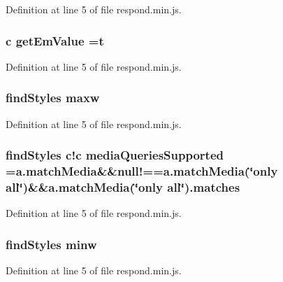 Definition at line 5 of file respond.\+min.\+js.

\subsubsection[{get\+Em\+Value}]{ {\bf c} get\+Em\+Value =t}\label{respond_8min_8js_a9327e80981b3e6a408cb1dc1857cf769}


Definition at line 5 of file respond.\+min.\+js.

\subsubsection[{maxw}]{\setlength{\rightskip}{0pt plus 5cm}find\+Styles maxw}\label{respond_8min_8js_a5149f9215d2d057c5f0988a9ce22ce62}


Definition at line 5 of file respond.\+min.\+js.

\subsubsection[{media\+Queries\+Supported}]{\setlength{\rightskip}{0pt plus 5cm}find\+Styles c!c media\+Queries\+Supported =a.\+match\+Media\&\&null!==a.\+match\+Media(\char`\"{}only all\char`\"{})\&\&a.\+match\+Media(\char`\"{}only all\char`\"{}).matches}\label{respond_8min_8js_a75b3b1d7c7a0f4717a582e5dde9a1a15}


Definition at line 5 of file respond.\+min.\+js.

\subsubsection[{minw}]{\setlength{\rightskip}{0pt plus 5cm}find\+Styles minw}\label{respond_8min_8js_a7a158773f9e9369674e843a8212e5e49}


Definition at line 5 of file respond.\+min.\+js.

